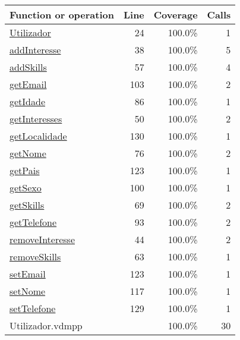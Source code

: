 \begin{longtable}{|l|r|r|r|}
\hline
Function or operation & Line & Coverage & Calls \\
\hline
\hline
\hyperref[Utilizador:24]{Utilizador} & 24&100.0\% & 1 \\
\hline
\hyperref[addInteresse:38]{addInteresse} & 38&100.0\% & 5 \\
\hline
\hyperref[addSkills:57]{addSkills} & 57&100.0\% & 4 \\
\hline
\hyperref[getEmail:103]{getEmail} & 103&100.0\% & 2 \\
\hline
\hyperref[getIdade:86]{getIdade} & 86&100.0\% & 1 \\
\hline
\hyperref[getInteresses:50]{getInteresses} & 50&100.0\% & 2 \\
\hline
\hyperref[getLocalidade:130]{getLocalidade} & 130&100.0\% & 1 \\
\hline
\hyperref[getNome:76]{getNome} & 76&100.0\% & 2 \\
\hline
\hyperref[getPais:123]{getPais} & 123&100.0\% & 1 \\
\hline
\hyperref[getSexo:100]{getSexo} & 100&100.0\% & 1 \\
\hline
\hyperref[getSkills:69]{getSkills} & 69&100.0\% & 2 \\
\hline
\hyperref[getTelefone:93]{getTelefone} & 93&100.0\% & 2 \\
\hline
\hyperref[removeInteresse:44]{removeInteresse} & 44&100.0\% & 2 \\
\hline
\hyperref[removeSkills:63]{removeSkills} & 63&100.0\% & 1 \\
\hline
\hyperref[setEmail:123]{setEmail} & 123&100.0\% & 1 \\
\hline
\hyperref[setNome:117]{setNome} & 117&100.0\% & 1 \\
\hline
\hyperref[setTelefone:129]{setTelefone} & 129&100.0\% & 1 \\
\hline
\hline
Utilizador.vdmpp & & 100.0\% & 30 \\
\hline
\end{longtable}

